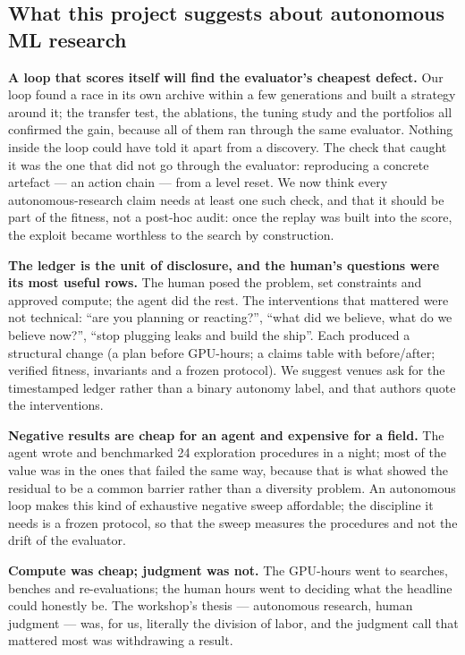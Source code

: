 \subsection*{What this project suggests about autonomous ML research}
\textbf{A loop that scores itself will find the evaluator's cheapest defect.} Our loop found a race in its own archive within a few
generations and built a strategy around it; the transfer test, the ablations, the tuning study and the portfolios all confirmed the gain,
because all of them ran through the same evaluator. Nothing inside the loop could have told it apart from a discovery. The check that
caught it was the one that did not go through the evaluator: reproducing a concrete artefact --- an action chain --- from a level reset.
We now think every autonomous-research claim needs at least one such check, and that it should be part of the fitness, not a
post-hoc audit: once the replay was built into the score, the exploit became worthless to the search by construction.

\textbf{The ledger is the unit of disclosure, and the human's questions were its most useful rows.} The human posed the problem, set
constraints and approved compute; the agent did the rest. The interventions that mattered were not technical: ``are you planning or
reacting?'', ``what did we believe, what do we believe now?'', ``stop plugging leaks and build the ship''. Each produced a
structural change (a plan before GPU-hours; a claims table with before/after; verified fitness, invariants and a frozen protocol).
We suggest venues ask for the timestamped ledger rather than a binary autonomy label, and that authors quote the interventions.

\textbf{Negative results are cheap for an agent and expensive for a field.} The agent wrote and benchmarked 24 exploration
procedures in a night; most of the value was in the ones that failed the same way, because that is what showed the residual to be a
common barrier rather than a diversity problem. An autonomous loop makes this kind of exhaustive negative sweep affordable; the
discipline it needs is a frozen protocol, so that the sweep measures the procedures and not the drift of the evaluator.

\textbf{Compute was cheap; judgment was not.} The GPU-hours went to searches, benches and re-evaluations; the human hours went to
deciding what the headline could honestly be. The workshop's thesis --- autonomous research, human judgment --- was, for us,
literally the division of labor, and the judgment call that mattered most was withdrawing a result.
